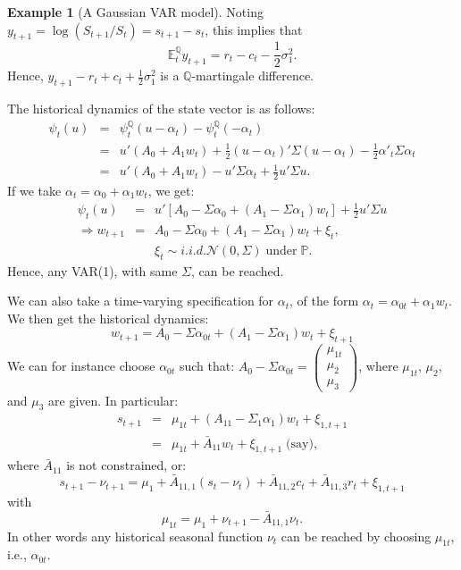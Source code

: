 \documentclass[
  12pt,
]{book}
\theoremstyle{definition}
\theoremstyle{definition}
\newtheorem{example}{Example}[chapter]
\theoremstyle{definition}
\theoremstyle{definition}
\theoremstyle{remark}
\begin{document}
\begin{example}[A Gaussian VAR model]
Noting \(y_{t+1} = \log (S_{t+1}/S_t) = s_{t+1} - s_t\), this implies that
\[
\mathbb{E}^{\mathbb{Q}}_t y_{t+1} = r_t - c_t - \frac{1}{2} \sigma^2_1.
\]
Hence, \(y_{t+1} - r_t + c_t + \frac{1}{2} \sigma^2_1\) is a \(\mathbb{Q}\)-martingale difference.

The historical dynamics of the state vector is as follows:
\[
\begin{array}{lcl}
\psi_t (u) & = & \psi^{\mathbb{Q}}_t (u-\alpha_t) - \psi^{\mathbb{Q}}_t (- \alpha_t) \\
&=& u' (A_0 + A_1 w_t) + \frac{1}{2} (u-\alpha_t)' \Sigma (u-\alpha_t)- \frac{1}{2} \alpha'_t
\Sigma \alpha_t \\
&=&u' (A_0 + A_1 w_t) - u' \Sigma \alpha_t + \frac{1}{2} u' \Sigma u.
\end{array}
\]
If we take \(\alpha_t = \alpha_0 + \alpha_1 w_t\), we get:
\begin{eqnarray*}
\psi_t (u) &=& u' [A_0 - \Sigma \alpha_0 + (A_1 - \Sigma \alpha_1) w_t] + \frac{1}{2} u' \Sigma u \\
\Rightarrow  w_{t+1} &=& A_0 - \Sigma \alpha_0 + (A_1 - \Sigma \alpha_1) w_t + \xi_t,\\
&& \xi_t \sim  i.i.d.   \mathcal{N}(0,\Sigma)\; \mbox{under}\;\mathbb{P}.
\end{eqnarray*}
Hence, any VAR(1), with same \(\Sigma\), can be reached.

We can also take a time-varying specification for \(\alpha_t\), of the form \(\alpha_t = \alpha_{0t} + \alpha_1 w_t\). We then get the historical dynamics:
\[
w_{t+1} = A_{0} - \Sigma \alpha_{0t} + (A_1 - \Sigma \alpha_1) w_t + \xi_{t+1}
\]
We can for instance choose \(\alpha_{0t}\) such that: \(A_{0} - \Sigma \alpha_{0t} = \left( \begin{array}{c} \mu_{1t} \\ \mu_2 \\ \mu_3 \end{array}\right)\), where \(\mu_{1t}\), \(\mu_2\), and \(\mu_3\) are given.
In particular:
\begin{eqnarray*}
s_{t+1} & = & \mu_{1t} + (A_{11} - \Sigma_1 \alpha_1) w_t + \xi_{1,t+1} \\
& = & \mu_{1t} + \bar{A}_{11} w_t + \xi_{1,t+1}\; \mbox{(say)}, \;
\end{eqnarray*}
where \(\bar{A}_{11}\) is not constrained, or:
\[
s_{t+1} - \nu_{t+1} = \mu_1 + \bar{A}_{11,1} (s_t - \nu_t) + \bar{A}_{11,2} c_t + \bar{A}_{11,3} r_t + \xi_{1,t+1}
\]
with
\[
\mu_{1t} = \mu_1 + \nu_{t+1} - \bar{A}_{11,1} \nu_t.
\]
In other words any historical seasonal function \(\nu_t\) can be reached by choosing \(\mu_{1t}\), i.e., \(\alpha_{0t}\).
\end{example}
\end{document}
